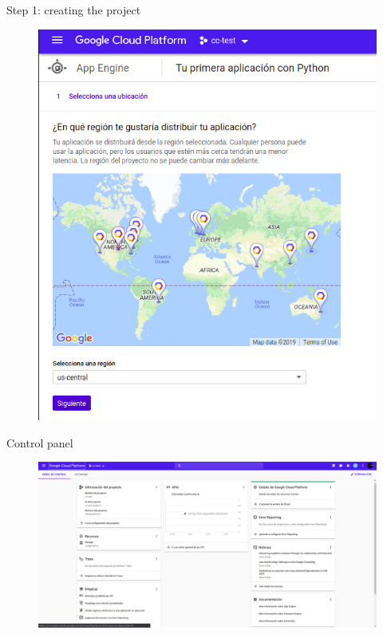 \documentclass{beamer}
\begin{document}
\begin{frame}[fragile]{Step 1: creating the project}
    \begin{figure}[H]
      \centering
      \includegraphics[scale=0.4]{img/tutorial/1select_region}
    \end{figure}
\end{frame}

\begin{frame}[fragile]{Control panel}
    \begin{figure}[H]
      \centering
      \includegraphics[scale=0.2]{img/tutorial/2controlpanel}
    \end{figure}
\end{frame}
\end{document}
